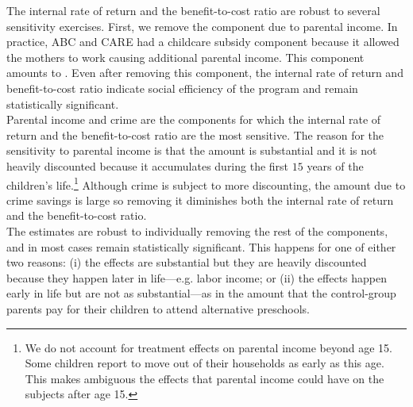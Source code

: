 \noindent The internal rate of return and the benefit-to-cost ratio are robust to several sensitivity exercises. First, we remove the component due to parental income. In practice, ABC and CARE had a childcare subsidy component because it allowed the mothers to work causing additional parental income. This component amounts to \parincomenpvp. Even after removing this component, the internal rate of return and benefit-to-cost ratio indicate social efficiency of the program and remain statistically significant.\\ 

\noindent Parental income and crime are the components for which the internal rate of return and the benefit-to-cost ratio are the most sensitive. The reason for the sensitivity to parental income is that the amount is substantial and it is not heavily discounted because it accumulates during the first $15$ years of the children's life.\footnote{We do not account for treatment effects on parental income beyond age 15. Some children report to move out of their households as early as this age. This makes ambiguous the effects that parental income could have on the subjects after age 15.} Although crime is subject to more discounting, the amount due to crime savings is large so removing it diminishes both the internal rate of return and the benefit-to-cost ratio.\\ 

\noindent The estimates are robust to individually removing the rest of the components, and in most cases remain statistically significant. This happens for one of either two reasons: (i) the effects are substantial but they are heavily discounted because they happen later in life---e.g. labor income; or (ii) the effects happen early in life but are not as substantial---as in the amount that the control-group parents pay for their children to attend alternative preschools.

